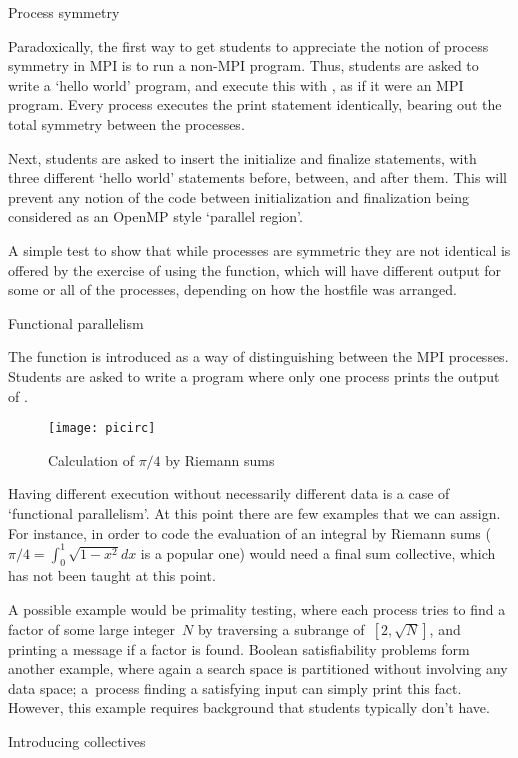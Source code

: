  {Process symmetry}

Paradoxically, the first way to get students to
appreciate
the notion of process symmetry in MPI is to run
a non-MPI program. Thus, students are asked
to write a `hello world' program, and execute this
with , as if it were an MPI program.
Every process executes the print statement identically,
bearing out the total symmetry between the processes.

Next, students are asked to insert the initialize
and finalize statements, with three different `hello world'
statements before, between, and after them.
This will prevent any notion of the code between initialization
and finalization being considered as an OpenMP style `parallel region'.

A simple test to show that while processes are symmetric they are
not identical is offered by the exercise of using the 
function, which will have different output for some or all of the processes,
depending on how the hostfile was arranged.

 {Functional parallelism}

The  function is introduced as a way of distinguishing
between the MPI processes. Students are asked to write a program
where only one process prints the output of .

\begin{wrapfigure}{r}{1.2in}
  \texttt{[image: picirc]}
  \caption{Calculation of $\pi/4$ by Riemann sums}
\end{wrapfigure}
%
Having different execution without necessarily different data is a case
of `functional parallelism'. At this point there are few examples
that we can assign. For instance, in order to code
the evaluation of an integral by Riemann sums ($\pi/4=\int_0^1\sqrt{1-x^2}dx$
is a popular one) would need a final sum collective, which has
not been taught at this point.

A possible example would be primality testing, where each process
tries to find a factor of some large integer~$N$ by traversing a subrange of~$[2,\sqrt N]$,
and printing a message if a factor is found. Boolean satisfiability problems
form another example, where again a search space is partitioned
without involving any data space; a~process finding a satisfying input
can simply print this fact. However, this example requires background
that students typically don't have.

 {Introducing collectives}

